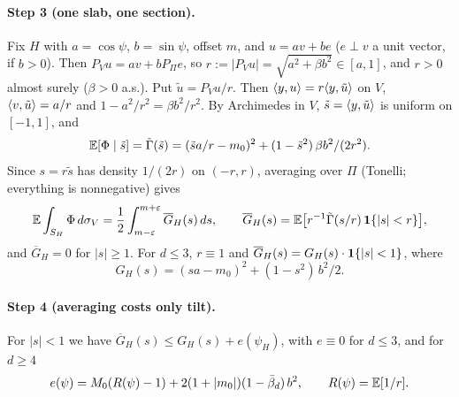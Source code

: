 \paragraph{Step 3 (one slab, one section).} Fix $H$ with $a = \cos\psi$, $b = \sin\psi$, offset
$m$, and $u = av + be$ ($e \perp v$ a unit vector, if $b > 0$). Then $P_V u = av + b P_\Pi e$, so
$r := |P_V u| = \sqrt{a^2 + \beta b^2} \in [a, 1]$, and $r > 0$ almost surely ($\beta > 0$ a.s.).
Put $\tilde u = P_V u / r$. Then
$\langle y,u\rangle = r \langle y,\tilde u\rangle$ on $V$, $\langle v,\tilde u\rangle = a/r$ and
$1 - a^2/r^2 = \beta b^2/r^2$. By Archimedes in $V$, $\tilde s = \langle y,\tilde u\rangle$ is uniform on
$[-1, 1]$, and
\begin{equation*}
  \mathbb{E}[\Phi \mid \tilde s] = \tilde\Gamma(\tilde s)
    = (\tilde s a/r - m_0)^2 + (1 - \tilde s^2)\, \beta b^2/(2r^2).
\end{equation*}
Since $s = r\tilde s$ has density $1/(2r)$ on $(-r, r)$, averaging over $\Pi$ (Tonelli; everything is
nonnegative) gives
\begin{equation*}
  \mathbb{E} \int_{S_H} \Phi \, d\sigma_V = \frac12 \int_{m-\varepsilon}^{m+\varepsilon} \overline G_H(s) \, ds, \qquad
  \overline G_H(s) = \mathbb{E}\bigl[r^{-1} \tilde\Gamma(s/r)\, \mathbf{1}\{|s| < r\}\bigr],
\end{equation*}
and $\overline G_H = 0$ for $|s| \ge 1$. For $d \le 3$, $r \equiv 1$ and
$\overline G_H(s) = G_H(s) \cdot \mathbf{1}\{|s| < 1\}$, where
\begin{equation*}
  G_H(s) = (sa - m_0)^2 + (1 - s^2)\, b^2/2.
\end{equation*}

\paragraph{Step 4 (averaging costs only tilt).} For $|s| < 1$ we have
$\overline G_H(s) \le G_H(s) + e(\psi_H)$, with $e \equiv 0$ for $d \le 3$, and for $d \ge 4$
\begin{equation*}
  e(\psi) = M_0(R(\psi) - 1) + 2(1 + |m_0|)(1 - \bar\beta_d)\, b^2, \qquad R(\psi) = \mathbb{E}[1/r].
\end{equation*}

